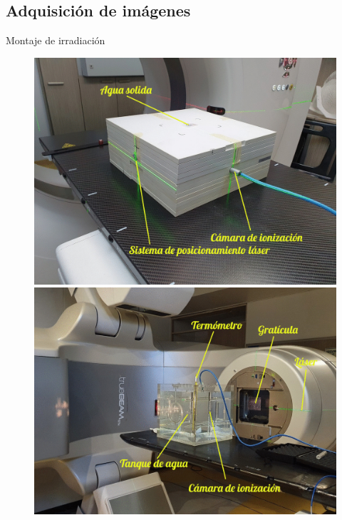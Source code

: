 \documentclass[12pt]{beamer}
\begin{document}
\subsection{Adquisición de imágenes}

\begin{frame}{Montaje de irradiación}
\begin{figure}[htp]%
	\centering
	\begin{minipage}{0.45\textwidth}
		\includegraphics[width=\textwidth]{images/elctrometro.jpg}
	\end{minipage}\hfill
	\begin{minipage}{0.45\textwidth}
		\includegraphics[width=\textwidth]{images/TRS398Editado2.jpg}

\end{minipage}
\end{figure}
\end{frame}
\end{document}
